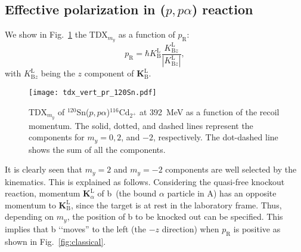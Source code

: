 \documentclass[%
 reprint,
superscriptaddress,
 amsmath,amssymb,
 aps,
]{revtex4-2}
\begin{document}










\subsection{Effective polarization in ($p,p\alpha$) reaction}
We show in Fig.~\ref{fig:TDX_DWIA} the TDX$_{m_y}$ 
as a function of $p_\mathrm{R}$:
\begin{equation}
  p_{\mathrm{R}} 
  =
  \hbar K^\mathrm{L}_\mathrm{B}
  \frac{K^\mathrm{L}_{\mathrm{B}z}}{\left|K^\mathrm{L}_{\mathrm{B}z}\right|},
\end{equation}
with $K^\mathrm{L}_{\mathrm{B}z}$ being the $z$ component of 
$\bm{K}^\mathrm{L}_{\mathrm{B}}$.
\begin{figure}[h]
  \centering
  \texttt{[image: tdx\_vert\_pr\_120Sn.pdf]}
  \caption{TDX$_{m_y}$ of $^{120}$Sn($p,p\alpha$)$^{116}$Cd$_{2^+}$ at 392~MeV 
  as a function of the recoil momentum.
  The solid, dotted, and dashed lines represent the components for 
  $m_y=0,2$, and $-2$, respectively. The dot-dashed line shows 
  the sum of all the components.}
  \label{fig:TDX_DWIA}
\end{figure}
It is clearly seen that $m_y = 2$ and $m_y = -2$ components are
well selected by the kinematics.
This is explained as follows.
Considering the quasi-free knockout reaction, momentum $\bm{K}^\mathrm{L}_\alpha$ 
of b~(the bound $\alpha$ particle in A) 
has an opposite momentum to $\bm{K}_\mathrm{B}^\mathrm{L}$,
since the target is at rest in the laboratory frame. 
Thus, depending on $m_y$, the position of b to be knocked out can be specified. 
This implies that b {\lq\lq}moves'' to the left (the $-z$ direction) when $p_\mathrm{R}$ 
is positive as shown in Fig.~\ref{fig:classical}.
\end{document}
